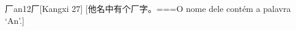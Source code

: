 \begin{EntryWithPhonetic}{厂}{an1}{2}{⼚}[Kangxi 27]
  [他名中有个厂字。===O nome dele contém a palavra `An'.]
\end{EntryWithPhonetic}

